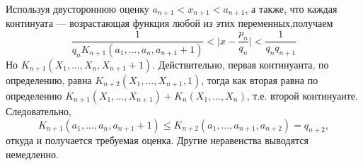 \documentclass{mai_book}
\begin{document}
\noindent
Используя двустороннюю оценку $a_{n+1}<x_{n+1}<a_{n+1}$, а также, что каждая\linebreak
континуата --- возрастающая функция любой из этих переменных,\linebreak получаем
$$\frac{1}{q_nK_{n+1}(a_1,...,a_n,a_{n+1}+1)}<\bigg|x-\frac{p_n}{q_n}\bigg|<\frac{1}{q_nq_{n+1}}$$
Но $K_{n+1}(X_1,...,X_n,X_{n+1}+1)$. Действительно, первая континуанта, по\linebreak
определению, равна $K_{n+2}(X_1,...,X_{n+1},1)$, тогда как вторая равна по\linebreak
определению $K_{n+1}(X_1,...,X_{n+1})+K_n(X_1,...,X_n)$, \:\:т.е. второй континуанте.\linebreak
Следовательно,
$$ K_{n+1}(a_1,...,a_n,a_{n+1}+1)\leqslant K_{n+2}(a_1,...,a_{n+1},a_{n+2})=q_{n+2},$$
откуда и получается требуемая оценка. Другие неравенства выводятся\linebreak
немедленно.
\end{document}

